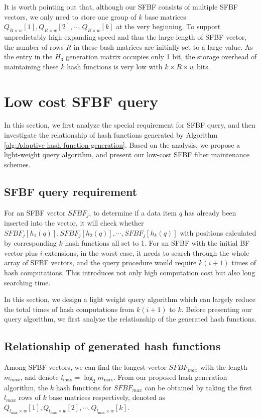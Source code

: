 \documentclass[10pt,journal,compsoc]{IEEEtran}
\newcommand{\rev}[1]{#1}
\begin{document}
It is worth pointing out that, although our SFBF consists of multiple SFBF vectors,
we only need to store one group of $k$ base matrices ${Q_{R \times w}}[1],{Q_{R \times w}}[2], \cdots ,{Q_{R \times w}}[k]$ at the very beginning. To support unpredictably high expanding speed and thus the large length of SFBF vector, the number of rows $R$ in these bash matrices are initially set to a large value. \rev{As the entry in the $H_3$ generation matrix occupies only 1 bit, the storage overhead of maintaining these $k$ hash functions  is very low with  $k \times R \times w$ bits.}

\section{Low cost SFBF query}
\label{sec: Low Cost Information Query and Data Maintenance}
In this section, we first analyze the special requirement for SFBF query, and then investigate the relationship of
hash functions generated by Algorithm \ref{alg:Adaptive hash function generation}. Based on the analysis, we propose a light-weight query algorithm, and present our low-cost SFBF filter maintenance schemes.

\subsection{SFBF query requirement}
For an SFBF vector $SFBF_j$, to determine if a data item $q$ has already been inserted into the vector, it will check whether $SFBF_j[{h_1}\left( {{q}} \right)],SFBF_j[{h_2}\left( {{q}} \right)], \cdots, SFBF_j[{h_k}\left( {{q}} \right)]$ with positions calculated by corresponding $k$ hash functions all set to 1. For an SFBF with the initial BF vector plus $i$ extensions, in the worst case, it needs to search through the whole array of SFBF vectors, and the query procedure would require $k(i+1)$ times of hash computations. This  introduces not only high computation cost but also long searching time.

In this section, we design a light weight query algorithm which can largely reduce the total times of hash computations  from $k(i+1)$ to $k$. Before  presenting our query algorithm, we first analyze the relationship of the generated hash functions.

\subsection{Relationship of generated hash functions}
Among SFBF vectors, we can find the longest vector $SFBF_{max}$ with the length $m_{max}$, and denote ${l_{\max }} = {\log _2}{m_{\max }}$. From our proposed hash generation algorithm, the $k$ hash functions for $SFBF_{max}$ can be obtained by taking the first $l_{max}$ rows of $k$ base matrices respectively, denoted as ${Q_{{l_{\max }} \times w}}[1],{Q_{{l_{\max }} \times w}}[2], \cdots ,{Q_{{l_{\max }} \times w}}[k]$.
\end{document}

